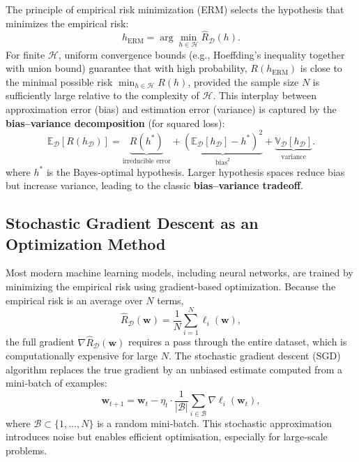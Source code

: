 \documentclass{tufte-handout}
\begin{document}
The principle of empirical risk minimization (ERM) selects the hypothesis that minimizes the empirical risk:
\begin{equation}
    h_{\text{ERM}} = \arg\min_{h \in \mathcal{H}} \widehat{R}_{\mathcal{D}}(h).
\end{equation}
For finite $\mathcal{H}$, uniform convergence bounds (e.g., Hoeffding's inequality together with union bound) guarantee that with high probability, $R(h_{\text{ERM}})$ is close to the minimal possible risk $\min_{h \in \mathcal{H}} R(h)$, provided the sample size $N$ is sufficiently large relative to the complexity of $\mathcal{H}$. This interplay between approximation error (bias) and estimation error (variance) is captured by the \textbf{bias–variance decomposition} (for squared loss):
\begin{equation}
    \mathbb{E}_{\mathcal{D}} \left[ R(h_{\mathcal{D}}) \right] = \underbrace{R(h^*)}_{\text{irreducible error}} + \underbrace{\left( \mathbb{E}_{\mathcal{D}}[h_{\mathcal{D}}] - h^* \right)^2}_{\text{bias}^2} + \underbrace{\mathbb{V}_{\mathcal{D}}[h_{\mathcal{D}}]}_{\text{variance}}.
\end{equation}
where $h^*$ is the Bayes-optimal hypothesis. Larger hypothesis spaces reduce bias but increase variance, leading to the classic \textbf{bias–variance tradeoff}.

\subsection{Stochastic Gradient Descent as an Optimization Method}

Most modern machine learning models, including neural networks, are trained by minimizing the empirical risk using gradient-based optimization. Because the empirical risk is an average over $N$ terms,
\[
\widehat{R}_{\mathcal{D}}(\mathbf{w}) = \frac{1}{N} \sum_{i=1}^N \ell_i(\mathbf{w}),
\]
the full gradient $\nabla \widehat{R}_{\mathcal{D}}(\mathbf{w})$ requires a pass through the entire dataset, which is computationally expensive for large $N$. The stochastic gradient descent (SGD) algorithm replaces the true gradient by an unbiased estimate computed from a mini‑batch of examples:
\[
\mathbf{w}_{t+1} = \mathbf{w}_t - \eta_t \cdot \frac{1}{|\mathcal{B}|} \sum_{i \in \mathcal{B}} \nabla \ell_i(\mathbf{w}_t),
\]
where $\mathcal{B} \subset \{1,\dots,N\}$ is a random mini‑batch. This stochastic approximation introduces noise but enables efficient optimisation, especially for large‑scale problems.
\end{document}
